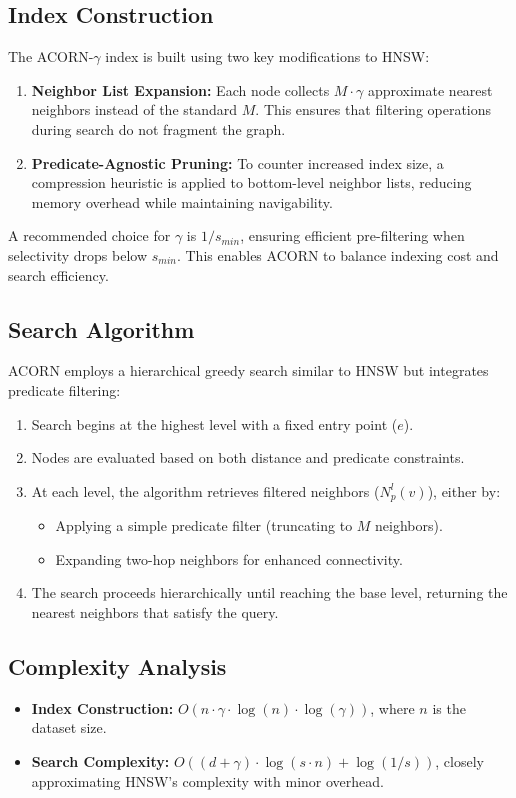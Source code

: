 \subsection{Index Construction}
The ACORN-$\gamma$ index is built using two key modifications to HNSW:
\begin{enumerate}
    \item \textbf{Neighbor List Expansion:} Each node collects $M \cdot \gamma$ approximate nearest neighbors instead of the standard $M$. This ensures that filtering operations during search do not fragment the graph.
    \item \textbf{Predicate-Agnostic Pruning:} To counter increased index size, a compression heuristic is applied to bottom-level neighbor lists, reducing memory overhead while maintaining navigability.
\end{enumerate}
A recommended choice for $\gamma$ is $1/s_{min}$, ensuring efficient pre-filtering when selectivity drops below $s_{min}$. This enables ACORN to balance indexing cost and search efficiency.

\subsection{Search Algorithm}
ACORN employs a hierarchical greedy search similar to HNSW but integrates predicate filtering:
\begin{enumerate}
    \item Search begins at the highest level with a fixed entry point ($e$).
    \item Nodes are evaluated based on both distance and predicate constraints.
    \item At each level, the algorithm retrieves filtered neighbors ($N^l_p(v)$), either by:
          \begin{itemize}
              \item Applying a simple predicate filter (truncating to $M$ neighbors).
              \item Expanding two-hop neighbors for enhanced connectivity.
          \end{itemize}
    \item The search proceeds hierarchically until reaching the base level, returning the nearest neighbors that satisfy the query.
\end{enumerate}

\subsection{Complexity Analysis}
\begin{itemize}
    \item \textbf{Index Construction:} $O(n \cdot \gamma \cdot \log(n) \cdot \log(\gamma))$, where $n$ is the dataset size.
    \item \textbf{Search Complexity:} $O((d + \gamma) \cdot \log(s \cdot n) + \log(1/s))$, closely approximating HNSW’s complexity with minor overhead.
\end{itemize}


